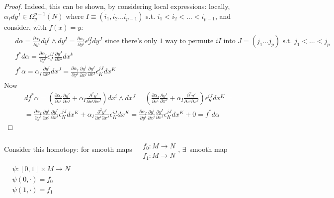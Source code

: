 \documentclass[10pt]{amsart}
\begin{document}
\begin{proof}
Indeed, this can be shown, by considering local expressions: locally, $\alpha_I dy^I \in \Omega^{p-1}_y(N)$ where $I \equiv (i_1, i_2 \dots i_{p-1})$ s.t. $i_1 < i_2 < \dots < i_{p-1}$, and consider, with $f(x)=y$:
\[
\begin{gathered}
  \begin{aligned}
    & d\alpha = \frac{ \partial \alpha_I}{ \partial y^i} dy^i \wedge dy^I = \frac{ \partial \alpha_I}{\partial y^i} \epsilon^{iI }_J dy^J \text{ since there's only 1 way to permute $iI$ into $J=(j_1 \dots j_p)$ s.t. $j_1 < \dots < j_p$ } \\ 
    & f^*d\alpha = \frac{ \partial \alpha_I}{ \partial y^i} \epsilon^{iI}_J \frac{ \partial y^J}{ \partial x^k} dx^k \\ 
    & f^*\alpha = \alpha_I \frac{ \partial y^I}{ \partial x^J} dx^J = \frac{ \partial \alpha_I}{ \partial y^i} \frac{ \partial y^i }{ \partial x^j} \frac{ \partial y^I}{ \partial x^J} \epsilon^{jJ}_K dx^K
\end{aligned}
\end{gathered}
\]
Now
\[
\begin{gathered}
  df^* \alpha = \left( \frac{ \partial \alpha_I}{ \partial x^i} \frac{ \partial y^I}{ \partial x^j} + \alpha_I \frac{ \partial^2 y^I }{ \partial x^i \partial x^J} \right) dx^i \wedge dx^J = \left( \frac{ \partial \alpha_I}{ \partial x^i} \frac{ \partial y^I}{ \partial x^J} + \alpha_I \frac{ \partial^2 y^I}{ \partial x^i \partial x^J} \right) \epsilon^{iJ}_K dx^K = \\
  = \frac{ \partial \alpha_I}{ \partial y^i} \frac{ \partial y^i}{ \partial x^j} \frac{ \partial y^I}{ \partial x^J} \epsilon^{jJ}_K dx^K + \alpha_I  \frac{ \partial^2 y^J}{ \partial x^i  \partial x^J} \epsilon^{iJ}_K dx^K =  \frac{ \partial \alpha_I}{ \partial y^i} \frac{ \partial y^i}{ \partial x^j} \frac{ \partial y^I}{ \partial x^J} \epsilon^{jJ}_K dx^K + 0 = f^*d\alpha
\end{gathered}
\]
\end{proof}




Consider this homotopy: for smooth maps $\begin{aligned} & \quad \\
  & f_0: M \to N \\
  & f_1: M\to N \end{aligned}$, $\exists \,$ smooth map $\begin{aligned} & \quad \\
  & \psi : [0,1] \times M \to N \\
  & \psi(0, \cdot ) = f_0 \\
  & \psi(1,\cdot ) = f_1 \end{aligned}$
\end{document}
